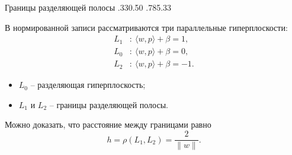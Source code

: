 \SPBGSplitSlide
  {Границы разделяющей полосы}
  {.330}{.50}
  {%
    \ReportSvmMargin
  }
  {.785}{.33}
  {%
    \SplitBody
    В нормированной записи рассматриваются три параллельные гиперплоскости:
    \[
      \begin{aligned}
        L_1&:\ \langle w,p\rangle+\beta=1,\\
        L_0&:\ \langle w,p\rangle+\beta=0,\\
        L_2&:\ \langle w,p\rangle+\beta=-1.
      \end{aligned}
    \]

    \begin{itemize}
  \item \(L_0\) -- разделяющая гиперплоскость;
  \item \(L_1\) и \(L_2\) -- границы разделяющей полосы.
\end{itemize}

    Можно доказать, что расстояние между границами равно
    \[
      h=\rho(L_1,L_2)=\frac{2}{\|w\|}.
    \]
  }
